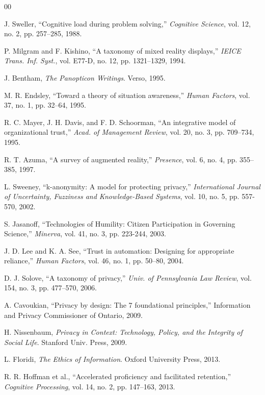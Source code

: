 \documentclass[conference]{IEEEtran}
\begin{document}
\begin{thebibliography}{00}

 J. Sweller, ``Cognitive load during problem solving,'' \textit{Cognitive Science}, vol. 12, no. 2, pp. 257--285, 1988.

 P. Milgram and F. Kishino, ``A taxonomy of mixed reality displays,'' \textit{IEICE Trans. Inf. Syst.}, vol. E77-D, no. 12, pp. 1321--1329, 1994.

 J. Bentham, \textit{The Panopticon Writings}. Verso, 1995.

 M. R. Endsley, ``Toward a theory of situation awareness,'' \textit{Human Factors}, vol. 37, no. 1, pp. 32--64, 1995.

 R. C. Mayer, J. H. Davis, and F. D. Schoorman, ``An integrative model of organizational trust,'' \textit{Acad. of Management Review}, vol. 20, no. 3, pp. 709--734, 1995.

 R. T. Azuma, ``A survey of augmented reality,'' \textit{Presence}, vol. 6, no. 4, pp. 355--385, 1997.

 L. Sweeney, ``k-anonymity: A model for protecting privacy,'' \textit{International Journal of Uncertainty, Fuzziness and Knowledge-Based Systems}, vol. 10, no. 5, pp. 557-570, 2002.

 S. Jasanoff, ``Technologies of Humility: Citizen Participation in Governing Science,'' \textit{Minerva}, vol. 41, no. 3, pp. 223-244, 2003.

 J. D. Lee and K. A. See, ``Trust in automation: Designing for appropriate reliance,'' \textit{Human Factors}, vol. 46, no. 1, pp. 50--80, 2004.

 D. J. Solove, ``A taxonomy of privacy,'' \textit{Univ. of Pennsylvania Law Review}, vol. 154, no. 3, pp. 477--570, 2006.

 A. Cavoukian, ``Privacy by design: The 7 foundational principles,'' Information and Privacy Commissioner of Ontario, 2009.

 H. Nissenbaum, \textit{Privacy in Context: Technology, Policy, and the Integrity of Social Life}. Stanford Univ. Press, 2009.

 L. Floridi, \textit{The Ethics of Information}. Oxford University Press, 2013.

 R. R. Hoffman et al., ``Accelerated proficiency and facilitated retention,'' \textit{Cognitive Processing}, vol. 14, no. 2, pp. 147--163, 2013.


\end{thebibliography}
\end{document}
